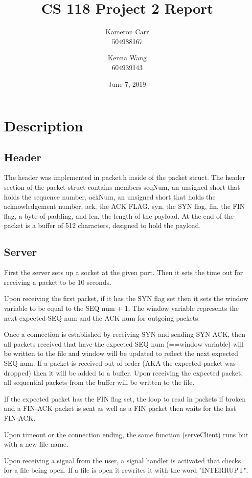 \documentclass[12pt]{article}
\title{CS 118 Project 2 Report}
\author{Kameron Carr \\ 504988167 \and Kenna Wang \\ 604939143}
\date{June 7, 2019}
\begin{document}
\maketitle

\section{Description}
\subsection{Header}
The header was implemented in packet.h inside of the packet struct. The header section of the packet struct contains members seqNum, an unsigned short that holds the sequence number, ackNum, an unsigned short that holds the acknowledgement number, ack, the ACK FLAG, syn, the SYN flag, fin, the FIN flag, a byte of padding, and len, the length of the payload. At the end of the packet is a buffer of 512 characters, designed to hold the payload.
\subsection{Server}
First the server sets up a socket at the given port. Then it sets the time out for receiving a packet to be 10 seconds.

Upon receiving the first packet, if it has the SYN flag set then it sets the window variable to be equal to the SEQ num + 1. The window variable represents the next expected SEQ num and the ACK num for outgoing packets.

Once a connection is established by receiving SYN and sending SYN ACK, then all packets received that have the expected SEQ num (==window variable) will be written to the file and window will be updated to reflect the next expected SEQ num. If a packet is received out of order (AKA the expected packet was dropped) then it will be added to a buffer. Upon receiving the expected packet, all sequential packets from the buffer will be written to the file.

If the expected packet has the FIN flag set, the loop to read in packets if broken and a FIN-ACK packet is sent as well as a FIN packet then waits for the last FIN-ACK.

Upon timeout or the connection ending, the same function (serveClient) runs but with a new file name.

Upon receiving a signal from the user, a signal handler is activated that checks for a file being open. If a file is open it rewrites it with the word "INTERRUPT".
\end{document}
